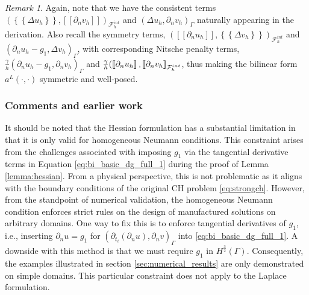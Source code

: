 \documentclass[11pt]{article}
\theoremstyle{remark}
\newtheorem*{remark}{Remark}
\newcommand{\mean}[1]{\left\{\!\!\left\{#1\right\}\!\!\right\}}
\newcommand{\jump}[1]{\left[\!\left[ #1 \right]\!\right]}
\numberwithin{equation}{section}
\begin{document}
                                     \begin{remark}
Again, note that we have the consistent terms $\left( \mean{  \Delta  u_{h} }, \jump{ \partial _{n }v_{h}} \right)_{\mathcal{F}_{h}^{int}} $ and $ \left(   \Delta  u_{h} ,  \partial _{n }v_{h} \right)_{\Gamma }$ naturally appearing in the
derivation. Also recall the symmetry terms, $(  \jump{ \partial _{n} u_{h} }, \mean{ \Delta  v_{h} })_{\mathcal{F}^{int}_{h} } $ and $ (  \partial _{n} u_{h} -  g_{1}, \Delta  v_{h}  )_{\Gamma  } $, with corresponding Nitsche penalty terms, $
\frac{\gamma }{h}(  \partial _{n} u_{h} - g_{1}, \partial _{n} v_{h}  )_{\Gamma  }$ and $ \\ \frac{\gamma }{h}( \jump{ \partial _{n} u_{h} } , \jump{ \partial _{n} v_{h} }
_{\mathcal{F}^{int}_{h} }  $, thus making the bilinear form $a^{L}( \cdot,\cdot ) $ symmetric and well-posed.
                                     \end{remark}

\subsubsection{Comments and earlier work}%
\label{ssub:remarks}

It should be noted that the Hessian formulation has a substantial limitation in that it is only valid for homogeneous Neumann conditions. This constraint arises from the challenges associated with imposing $g_{1}$ via the tangential derivative terms
in Equation \eqref{eq:bi_basic_dg_full_1} during the proof of Lemma \ref{lemma:hessian}.
From a physical perspective, this is not problematic as it aligns with the boundary conditions of the original CH problem \eqref{eq:strongch}. However, from the standpoint of numerical validation, the homogeneous Neumann condition enforces strict
rules on the design of manufactured solutions on arbitrary domains. One way to fix this is to enforce tangential derivatives of $g_{1}$, i.e., inserting $\partial _{n}u = g_{1}$ for $ ( \partial _{t_{i}}( \partial_{n}  u ) , \partial _{n} v)_\Gamma  $ into
\eqref{eq:bi_basic_dg_full_1}. A downside with this method is that we must require $g_{1}$ in $ H^{\frac{3}{2}}( \Gamma ) $.
Consequently, the examples illustrated in section \ref{sec:numerical_results} are only demonstrated on simple domains. This particular constraint does not apply to the Laplace formulation.
\end{document}
